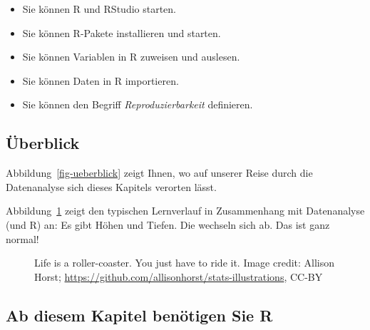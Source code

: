 \documentclass[
  a4paper,
  DIV=11]{scrreprt}
\providecommand{\tightlist}{%
  \setlength{\itemsep}{0pt}\setlength{\parskip}{0pt}}\usepackage{longtable,booktabs,array}
\theoremstyle{definition}
\theoremstyle{definition}
\theoremstyle{definition}
\theoremstyle{remark}
\begin{document}
\begin{itemize}
\tightlist
\item
  Sie können R und RStudio starten.
\item
  Sie können R-Pakete installieren und starten.
\item
  Sie können Variablen in R zuweisen und auslesen.
\item
  Sie können Daten in R importieren.
\item
  Sie können den Begriff \emph{Reproduzierbarkeit} definieren.
\end{itemize}

\subsection{Überblick}\label{uxfcberblick-1}

Abbildung~\ref{fig-ueberblick} zeigt Ihnen, wo auf unserer Reise durch
die Datenanalyse sich dieses Kapitels verorten lässt.

Abbildung~\ref{fig-roller} zeigt den typischen Lernverlauf in
Zusammenhang mit Datenanalyse (und R) an: Es gibt Höhen und Tiefen. Die
wechseln sich ab. Das ist ganz normal!

\begin{figure}


\caption{\label{fig-roller}Life is a roller-coaster. You just have to
ride it. Image credit: Allison Horst;
\url{https://github.com/allisonhorst/stats-illustrations}, CC-BY}

\end{figure}%

\subsection{Ab diesem Kapitel benötigen Sie
R}\label{ab-diesem-kapitel-benuxf6tigen-sie-r}
\end{document}
